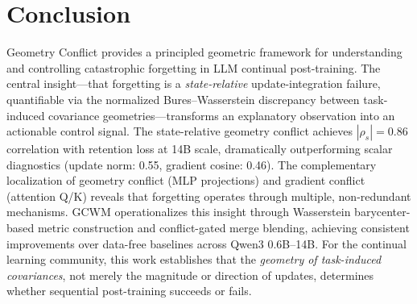 \documentclass[11pt]{article}
\begin{document}
\section{Conclusion}

Geometry Conflict provides a principled geometric framework for understanding and controlling catastrophic forgetting in LLM continual post-training. The central insight---that forgetting is a \emph{state-relative} update-integration failure, quantifiable via the normalized Bures--Wasserstein discrepancy between task-induced covariance geometries---transforms an explanatory observation into an actionable control signal. The state-relative geometry conflict achieves $|\rho_s| = 0.86$ correlation with retention loss at 14B scale, dramatically outperforming scalar diagnostics (update norm: 0.55, gradient cosine: 0.46). The complementary localization of geometry conflict (MLP projections) and gradient conflict (attention Q/K) reveals that forgetting operates through multiple, non-redundant mechanisms. GCWM operationalizes this insight through Wasserstein barycenter-based metric construction and conflict-gated merge blending, achieving consistent improvements over data-free baselines across Qwen3 0.6B--14B. For the continual learning community, this work establishes that the \emph{geometry of task-induced covariances}, not merely the magnitude or direction of updates, determines whether sequential post-training succeeds or fails.
\end{document}
